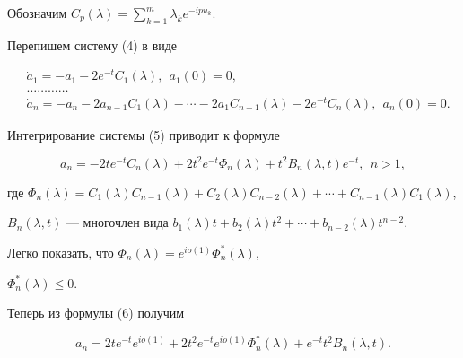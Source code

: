 Обозначим $C_p(\lambda)=\sum\limits^m_{k=1}\lambda_k e^{-i p u_k}$. 


Перепишем систему (4) в виде 


\begin{equation} 


\begin{split} 


&\Dot a_1=-a_1-2e^{-t}C_1(\lambda),\ \ a_1(0)=0,\\ 


&\dotsc\dotsc\dotsc\dotsc \\ 


&\Dot a_n=-a_n-2a_{n-1}C_1(\lambda)-\dotsb- 


2a_1C_{n-1}(\lambda)-2e^{-t}C_n(\lambda), 


\ \ a_n(0)=0. 


\end{split} 


\end{equation} 


Интегрирование системы (5) приводит к формуле 


\begin{equation} 


a_n=-2t e^{-t}C_n(\lambda)+2t^2e^{-t}\Phi_n(\lambda) 


+t^2B_n(\lambda,t)e^{-t},\ \ n>1, 


\end{equation} 


где $\Phi_n(\lambda)=C_1(\lambda)C_{n-1}(\lambda)+ 


C_2(\lambda)C_{n-2}(\lambda)+\dotsb+ C_{n-1}(\lambda)C_1(\lambda)$, 


$B_n(\lambda,t)$ --- многочлен вида $b_1(\lambda)t+b_2(\lambda)t^2+ 


\dotsb+b_{n-2}(\lambda)t^{n-2}$. 


Легко показать, что $\Phi_n(\lambda)=e^{i o(1)}\Phi^*_n(\lambda)$, 


$\Phi^*_n(\lambda)\le0$. 


 


Теперь из формулы (6) получим


\begin{equation} 


a_n=2t e^{-t}e^{i o(1)}+2t^2e^{-t}e^{i o(1)} 


\Phi^*_n(\lambda)+e^{-t}t^2B_n(\lambda,t). 


\end{equation} 


